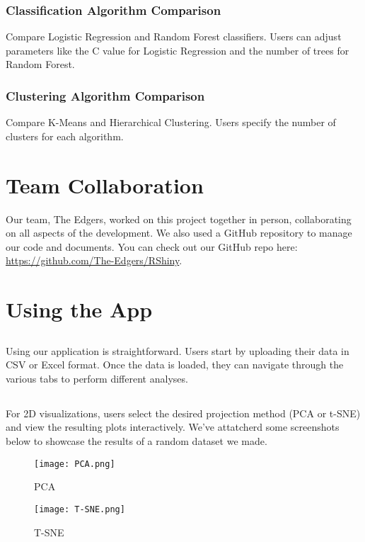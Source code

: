 \documentclass{article}
\begin{document}
\subsubsection{Classification Algorithm Comparison}
Compare Logistic Regression and Random Forest classifiers. Users can adjust parameters like the C value for Logistic Regression and the number of trees for Random Forest.

\subsubsection{Clustering Algorithm Comparison}
Compare K-Means and Hierarchical Clustering. Users specify the number of clusters for each algorithm.


\section{Team Collaboration}
Our team, The Edgers, worked on this project together in person, collaborating on all aspects of the development. We also used a GitHub repository to manage our code and documents. You can check out our GitHub repo here:
\url{https://github.com/The-Edgers/RShiny}.

\section{Using the App}
\subsection{}Using our application is straightforward. Users start by uploading their data in CSV or Excel format. Once the data is loaded, they can navigate through the various tabs to perform different analyses.

\subsection{}For 2D visualizations, users select the desired projection method (PCA or t-SNE) and view the resulting plots interactively.  We've attatcherd some screenshots below to showcase the results of a random dataset we made.

\begin{figure}[H]
    \centering
    \texttt{[image: PCA.png]}
    \caption{PCA}
\end{figure}
\begin{figure}[H]
    \centering
    \texttt{[image: T-SNE.png]}
    \caption{T-SNE}
\end{figure}
\end{document}
